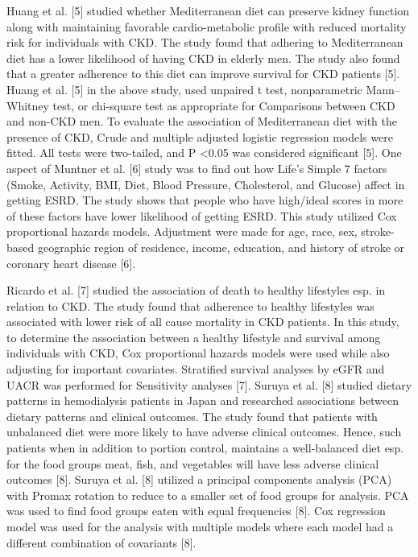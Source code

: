 \medskip
\noindent Huang et al. [5] studied whether Mediterranean diet can preserve kidney function along with maintaining favorable cardio-metabolic profile with reduced mortality risk for individuals with CKD. The study found that adhering to Mediterranean diet has a lower likelihood of having CKD in elderly men. The study also found that a greater adherence to this diet can improve survival for CKD patients [5]. Huang et al. [5] in the above study, used unpaired t test, nonparametric Mann–Whitney test, or chi-square test as appropriate for Comparisons between CKD and non-CKD men. To evaluate the association of Mediterranean diet with the presence of CKD, Crude and multiple adjusted logistic regression models were fitted. All tests were two-tailed, and P \textless 0.05 was considered significant [5]. One aspect of Muntner et al. [6] study was to find out how Life’s Simple 7 factors (Smoke, Activity, BMI, Diet, Blood Pressure, Cholesterol, and Glucose) affect in getting ESRD. The study shows that people who have high/ideal scores in more of these factors have lower likelihood of getting ESRD. This study utilized Cox proportional hazards models. Adjustment were made for age, race, sex, stroke-based geographic region of residence, income, education, and history of stroke or coronary heart disease [6].


\medskip
\noindent  Ricardo et al. [7] studied the association of death to healthy lifestyles esp. in relation to CKD. The study found that adherence to healthy lifestyles was associated with lower risk of all cause mortality in CKD patients. In this study, to determine the association between a healthy lifestyle and survival among individuals with CKD, Cox proportional hazards models were used while also adjusting for important covariates. Stratified survival analyses by eGFR and UACR was performed for Sensitivity analyses [7]. Suruya et al. [8] studied dietary patterns in hemodialysis patients in Japan and researched associations between dietary patterns and clinical outcomes. The study found that patients with unbalanced diet were more likely to have adverse clinical outcomes. Hence, such patients when in addition to portion control, maintains a well-balanced diet esp. for the food groups meat, fish, and vegetables will have less adverse clinical outcomes [8]. Suruya et al. [8] utilized a principal components analysis (PCA) with Promax rotation to reduce to a smaller set of food groups for analysis. PCA was used to find food groups eaten with equal frequencies [8]. Cox regression model was used for the analysis with multiple models where each model had a different combination of covariants [8].

